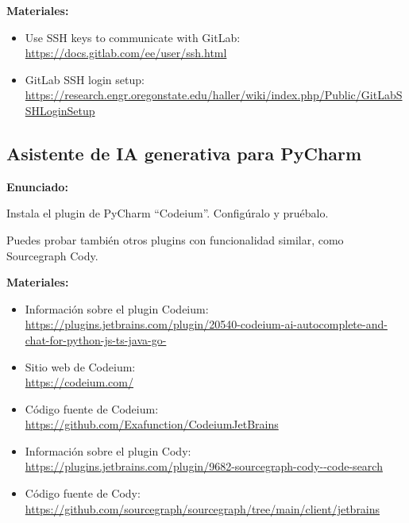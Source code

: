 \textbf{Materiales:}

\begin{itemize}
\item Use SSH keys to communicate with GitLab: \\
  \url{https://docs.gitlab.com/ee/user/ssh.html}
\item GitLab SSH login setup: \\
  \url{https://research.engr.oregonstate.edu/haller/wiki/index.php/Public/GitLabSSHLoginSetup}
\end{itemize}


\subsection{Asistente de IA generativa para PyCharm}
\label{subsec:practicas-pycharm-ia}

\textbf{Enunciado:}

Instala el plugin de PyCharm ``Codeium''. Configúralo y pruébalo.

Puedes probar también otros plugins con funcionalidad similar, como Sourcegraph Cody.

\textbf{Materiales:}

\begin{itemize}
\item Información sobre el plugin Codeium: \\
  \url{https://plugins.jetbrains.com/plugin/20540-codeium-ai-autocomplete-and-chat-for-python-js-ts-java-go-}
\item Sitio web de Codeium: \\
  \url{https://codeium.com/}
\item Código fuente de Codeium: \\
  \url{https://github.com/Exafunction/CodeiumJetBrains}
\item Información sobre el plugin Cody: \\
  \url{https://plugins.jetbrains.com/plugin/9682-sourcegraph-cody--code-search}
\item Código fuente de Cody: \\
  \url{https://github.com/sourcegraph/sourcegraph/tree/main/client/jetbrains}
\end{itemize}


